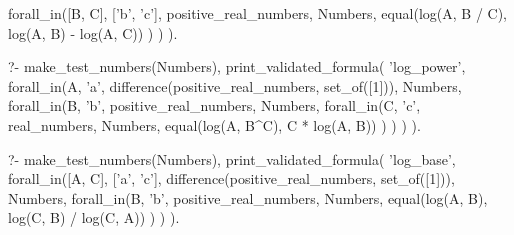 \begin{fact}
\begin{prolog}
			forall_in([B, C], ['b', 'c'], positive_real_numbers, Numbers,
				equal(log(A, B / C), log(A, B) - log(A, C))
			)
		)
	).				
\end{prolog}
\begin{prolog}
?-	make_test_numbers(Numbers),
	print_validated_formula(
		'log_power',
		forall_in(A, 'a', difference(positive_real_numbers, set_of([1])), Numbers,
			forall_in(B, 'b', positive_real_numbers, Numbers, 
				forall_in(C, 'c', real_numbers, Numbers,
					equal(log(A, B^C), C * log(A, B))
				)
			)
		)
	).
\end{prolog}
\begin{prolog}
?-	make_test_numbers(Numbers),
	print_validated_formula(
		'log_base',
		forall_in([A, C], ['a', 'c'], difference(positive_real_numbers, set_of([1])), Numbers,
			forall_in(B, 'b', positive_real_numbers, Numbers,
				equal(log(A, B), log(C, B) / log(C, A))
			)
		)
	).				
\end{prolog}
\end{fact}
